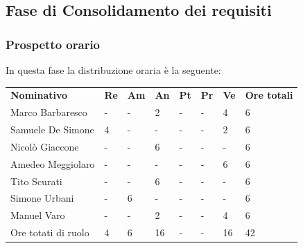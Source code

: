     
\subsection{Fase di Consolidamento dei requisiti}
    \subsubsection{Prospetto orario}
    In questa fase la distribuzione oraria è la seguente:

        \begin{center}
            \begin{table}[ht!]
                \centering
                \renewcommand{\arraystretch}{1.8}
                \begin{tabular}{p{100px} p{20px} p{20px} p{20px} p{20px} p{20px} p{20px} p{50px} }
                    \rowcolor{logo!70} \textbf{Nominativo} & \textbf{Re} & \textbf{Am} & \textbf{An} & \textbf{Pt} & \textbf{Pr} & \textbf{Ve} & \textbf{Ore totali}\\
                    Marco Barbaresco & - & - & 2 & - & - & 4 & 6\\
                    Samuele De Simone & 4 & - & - & - & - & 2 & 6\\
                    Nicolò Giaccone & - & - & 6 & - & - & - & 6\\
                    Amedeo Meggiolaro & - & - & - & - & - & 6 & 6\\
                    Tito Scurati & - & - & 6 & - & - & - & 6\\
                    Simone Urbani & - & 6 & - & - & - & - & 6\\
                    Manuel Varo & - & - & 2 & - & - & 4 & 6\\
                    Ore totati di ruolo & 4 & 6 & 16 & - & - & 16 & 42\\
                \end{tabular}
            \end{table}
        \end{center}
        \pagebreak

